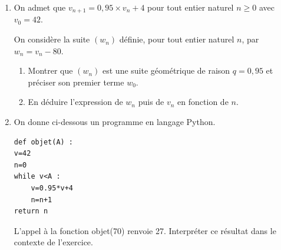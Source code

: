 \begin{enumerate}
\item  On admet que $v_{n+1} = 0,95\times v_n + 4$ pour tout entier naturel $n\geqslant 0$ avec $v_0 = 42$.

On considère la suite $(w_n)$ définie, pour tout entier naturel $n$, par $w_n= v_n-80$.
	\begin{enumerate}
		\item Montrer que $\left(w_n\right)$ est une suite géométrique de raison $q = 0,95$ et préciser son premier terme $w_0$.
		\item En déduire l'expression de $w_n$ puis de $ v_n$ en fonction de $n$.

	\end{enumerate}
\item On donne ci-dessous un programme en langage Python.

\begin{center}
\begin{lstlisting}[style=python]
def objet(A) :
v=42
n=0
while v<A :
	v=0.95*v+4
	n=n+1
return n 
\end{lstlisting}
\end{center}

L'appel à la fonction objet(70) renvoie 27. Interpréter ce résultat dans le contexte de l'exercice.
\end{enumerate}
